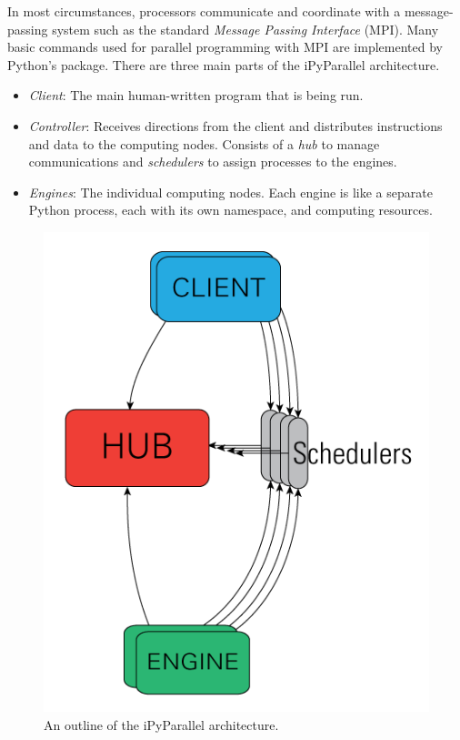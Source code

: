 In most circumstances, processors communicate and coordinate with a message-passing system such as the standard \emph{Message Passing Interface} (MPI).
Many basic commands used for parallel programming with MPI are implemented by Python's  package.
There are three main parts of the iPyParallel architecture.
\begin{itemize}
\item \emph{Client}: The main human-written program that is being run.
\item \emph{Controller}: Receives directions from the client and distributes instructions and data to the computing nodes.
Consists of a \emph{hub} to manage communications and \emph{schedulers} to assign processes to the engines.
\item \emph{Engines}: The individual computing nodes.
Each engine is like a separate Python process, each with its own namespace, and computing resources.
\end{itemize}

\begin{figure}[H]
    \includegraphics[width=.4\textwidth]{figures/ipyarch.png}
\caption{An outline of the iPyParallel architecture.}
\label{fig:ipyarch}
\end{figure}

